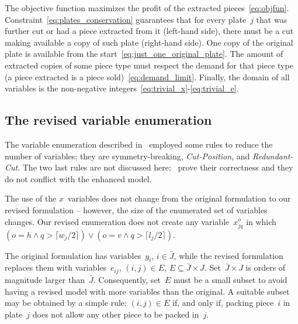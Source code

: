 \documentclass[smallextended]{svjour3}       %
\begin{document}
The objective function maximizes the profit of the extracted pieces~\eqref{eq:objfun}.
Constraint~\eqref{eq:plates_conservation} guarantees that for every plate~\(j\) that was further cut or had a piece extracted from it (left-hand side), there must be a cut making available a copy of such plate (right-hand side).
One copy of the original plate is available from the start~\eqref{eq:just_one_original_plate}.
The amount of extracted copies of some piece type must respect the demand for that piece type (a piece extracted is a piece sold)~\eqref{eq:demand_limit}.
Finally, the domain of all variables is the non-negative integers~\eqref{eq:trivial_x}-\eqref{eq:trivial_e}.

\subsection{The revised variable enumeration}
\label{sec:var_enum}

The variable enumeration described in~\cite{furini:2016} employed some rules to reduce the number of variables; they are symmetry-breaking, \emph{Cut-Position}, and \emph{Redundant-Cut}.
The two last rules are not discussed here; \cite{furini:2016}~prove their correctness and they do not conflict with the enhanced model.

The use of the \(x\)~variables does not change from the original formulation to our revised formulation -- however, the size of the enumerated set of variables changes.
Our revised enumeration does not create any variable~\(x^o_{jq}\) in which \((o = h \land q > \lceil w_j / 2 \rceil) \lor (o = v \land q > \lceil l_j / 2 \rceil)\).

The original formulation has variables~\(y_i\), \(i \in \bar{J}\), while the revised formulation replaces them with variables~\(e_{ij}\), \((i, j) \in E\), \(E \subseteq \bar{J} \times J\).
Set~\(\bar{J} \times J\) is orders of magnitude larger than~\(\bar{J}\).
Consequently, set~\(E\) must be a small subset to avoid having a revised model with more variables than the original.
A suitable subset may be obtained by a simple rule: \((i, j) \in E\) if, and only if, packing piece~\(i\) in plate~\(j\) does not allow any other piece to be packed in~\(j\).

\end{document}
